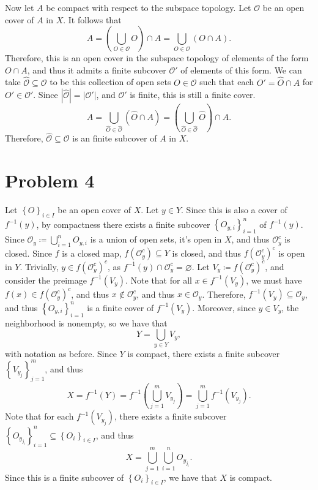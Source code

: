\documentclass[11pt, letterpaper]{article}
\begin{document}
Now let $A$ be compact with respect to the subspace topology. Let $\mathcal{O} $ be an open cover of $A$ in $X$. It follows that
\[
	A=\left(\bigcup_{O\in \mathcal{O} }O \right)\cap A=\bigcup_{O\in \mathcal{O} } \left( O \cap A \right) 
.\]
Therefore, this is an open cover in the subspace topology of elements of the form $O \cap A$, and thus it admits a finite subcover $\mathcal{O} '$ of elements of this form. We can take $\hat{\mathcal{O} }\subseteq \mathcal{O} $ to be this collection of open sets $O\in \mathcal{O} $ such that each $O'=\hat{O} \cap A$ for $O'\in \mathcal{O}'$. Since $\left| \hat{\mathcal{O}} \right| =\left| \mathcal{O} ' \right| $, and $\mathcal{O} '$ is finite, this is still a finite cover.
\[
	A=\bigcup_{\hat{O}\in \hat{\mathcal{O} }} \left( \hat{O}\cap A \right) =\left( \bigcup_{\hat{O}\in \hat{\mathcal{O} }} \hat{O} \right) \cap A
.\]
Therefore, $\hat{\mathcal{O} }\subseteq \mathcal{O} $ is an finite subcover of $A$ in $X$.
\section*{Problem 4}
Let $\left\{ O \right\}_{i\in I} $ be an open cover of $X$. Let $y\in Y$. Since this is also a cover of $f^{-1} (y)$, by compactness there exists a finite subcover $\left\{ O_{y,i}  \right\}_{i=1}^n$ of $f^{-1} (y)$. Since $\mathcal{O}_y\coloneqq \bigcup_{i=1}^n O_{y,i}  $ is a union of open sets, it's open in $X$, and thus $\mathcal{O}_y^{c} $ is closed. Since $f$ is a closed map, $f\left( \mathcal{O}_y^{c}  \right) \subseteq Y$ is closed, and thus $f\left( \mathcal{O}_y^{c}  \right) ^{c} $ is open in $Y$. Trivially, $y\in f\left( \mathcal{O}_y^{c}  \right) ^{c} $, as $f^{-1} (y)\cap \mathcal{O}_y ^{c} =\varnothing $. Let $V_y \coloneqq f\left( \mathcal{O}_y^{c}  \right) ^{c} $, and consider the preimage $f^{-1} (V_y)$. Note that for all $x\in f^{-1} (V_y)$, we must have $f(x)\in f(\mathcal{O}_y^{c} )^{c} $, and thus $x\notin \mathcal{O}_y ^{c} $, and thus $x\in \mathcal{O}_y$. Therefore, $f^{-1} (V_y)\subseteq \mathcal{O}_y$, and thus $\left\{ O_{y,i}  \right\}_{i=1}^n$ is a finite cover of $f^{-1} (V_y)$. Moreover, since $y\in V_y$, the neighborhood is nonempty, so we have that
\[
	Y=\bigcup_{y\in Y} V_y
,\]
with notation as before. Since $Y$ is compact, there exists a finite subcover $\left\{ V_{y_j}  \right\}_{j=1}^m$, and thus
\[
	X=f^{-1} (Y)=f^{-1} \left( \bigcup_{j=1}^m V_{y_j}  \right) =\bigcup_{j=1} ^m f^{-1} (V_{y_j} )
.\]
Note that for each $f^{-1} (V_{y_j} )$, there exists a finite subcover $\left\{ O_{y_{j_i} }  \right\}_{i=1}^n\subseteq \left\{ O_i \right\}_{i\in I}  $, and thus
\[
	X=\bigcup_{j=1}^m \bigcup_{i=1}^n O_{y_{j_i} } 
.\]
Since this is a finite subcover of $\left\{ O_i \right\}_{i\in I} $, we have that $X$ is compact.
\end{document}
